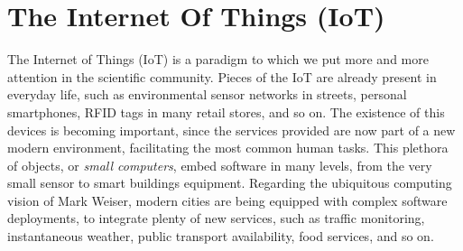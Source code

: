 \chapter{The Internet Of Things (IoT)}
\label{sec:IoT}
The Internet of Things (IoT) is a paradigm to which we put more and more attention in the scientific community\cite{atzori2010iotsurvey}.
Pieces of the IoT are already present in everyday life, such as environmental sensor networks in streets, personal smartphones, RFID tags in many retail stores, and so on.
The existence of this devices is becoming important, since the services provided are now part of a new modern environment, facilitating the most common human tasks.
This plethora of objects, or \textit{small computers}, embed software in many levels, from the very small sensor to smart buildings equipment.
Regarding the ubiquitous computing vision of Mark Weiser\cite{weiser1999ubiquitous}, modern cities are being equipped with complex software deployments, to integrate plenty of new services, such as traffic monitoring, instantaneous weather, public transport availability, food services, and so on.





